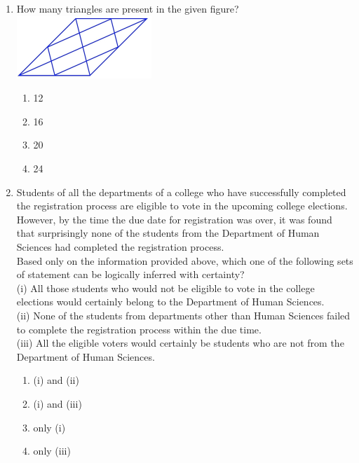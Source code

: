 \documentclass[journal,12pt,onecolumn]{IEEEtran}
\theoremstyle{remark}
\begin{document}
\begin{enumerate}
\newpage

    

\item How many triangles are present in the given figure? \\
\includegraphics[width=0.4\textwidth]{figs/img 1.jpeg} 

\begin{enumerate}
\item 12
\item 16
\item 20
\item 24
\end{enumerate}
\hfill{}
\item Students of all the departments of a college who have successfully completed the registration process are eligible to vote in the upcoming college elections. However, by the time the due date for registration was over, it was found that surprisingly none of the students from the Department of Human Sciences had completed the registration process. \\

Based only on the information provided above, which one of the following sets of statement can be logically inferred with certainty? \\
(i) All those students who would not be eligible to vote in the college elections would certainly belong to the Department of Human Sciences. \\
(ii) None of the students from departments other than Human Sciences failed to complete the registration process within the due time. \\
(iii) All the eligible voters would certainly be students who are not from the Department of Human Sciences. \\

\begin{enumerate}
\item (i) and (ii)
\item (i) and (iii)
\item only (i)
\item only (iii)
\end{enumerate}
\hfill{}


\end{enumerate}
\end{document}
